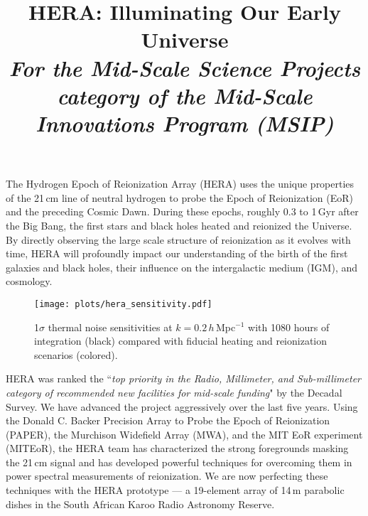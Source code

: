 \documentclass[preprint,11pt]{aastex}
\begin{document}
\title{HERA: Illuminating Our Early Universe\\
{\it For the Mid-Scale Science Projects category of the Mid-Scale Innovations Program (MSIP)}} 
\vspace{6pt}

{ \setlength{\parindent}{0cm}}
The Hydrogen Epoch of Reionization Array (HERA) uses the unique properties of the 21\,cm line of neutral
hydrogen to probe the Epoch of Reionization (EoR) and the preceding
Cosmic Dawn.  During these epochs, roughly 0.3 to 1\,Gyr after the Big Bang,
the first stars and black holes heated and reionized the Universe. 
By directly observing the large scale
structure of reionization as it evolves with time,
HERA will profoundly impact our understanding of the
birth of the first galaxies and black holes, their influence on the
intergalactic medium (IGM), and cosmology. %


\begin{wrapfigure}{R}{0.4\textwidth}
\vspace{-15pt}
\centering
    \texttt{[image: plots/hera\_sensitivity.pdf]}
  \vspace{-28pt}
  \caption{ 1$\sigma$ thermal noise sensitivities at $k\!=\!0.2$\,$h$\,Mpc$^{-1}$ 
with 1080 hours of integration (black)
compared with fiducial heating and reionization scenarios (colored). }
	\label{fig:Sensitivities}
  \vspace{-10pt}
\end{wrapfigure}

HERA was ranked the ``{\sl top priority in the Radio, Millimeter, and
Sub-millimeter category of recommended new facilities for mid-scale
funding}" by the Decadal Survey. We have advanced the
project aggressively over the last five years. Using the Donald
C. Backer Precision Array to Probe the Epoch of Reionization (PAPER),
the Murchison Widefield Array (MWA), and the MIT EoR experiment (MITEoR),
the HERA team has characterized the strong foregrounds masking the 21\,cm signal and has
developed powerful techniques for overcoming them in power spectral measurements of reionization.
We are now
perfecting these techniques with the HERA prototype --- a 19-element
array of 14\,m parabolic dishes in the South African Karoo Radio Astronomy Reserve.
\end{document}
